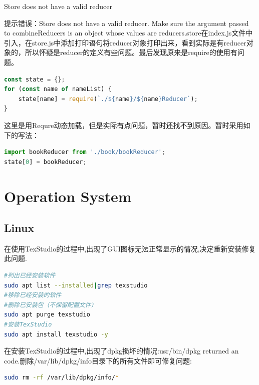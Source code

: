 \documentclass[12pt]{book}
\makeatletter
\numberwithin{dummy}{section}
\theoremstyle{ocrenumbox}
\theoremstyle{blacknumex}
\theoremstyle{blacknumbox}
\theoremstyle{ocrenum}
\renewcommand\paragraph{\@startsection{paragraph}{4}{\z@}
	{-2ex \@plus-.2ex \@minus .2ex}
	{.1ex}
	{\normalfont\small\sffamily\bfseries}}
\makeatother
\begin{document}
\paragraph{Store does not have a valid reducer}

提示错误：Store does not have a valid reducer. Make sure the argument passed to combineReducers is an object whose values are reducers.store在index.js文件中引入，在store.js中添加打印语句将reducer对象打印出来，看到实际是有reducer对象的，所以怀疑是reducer的定义有些问题。最后发现原来是require的使用有问题。

\begin{lstlisting}[language=Javascript]
const state = {};
for (const name of nameList) {
	state[name] = require(`./${name}/${name}Reducer`);
}
\end{lstlisting}

这里是用Requre动态加载，但是实际有点问题，暂时还找不到原因。暂时采用如下的写法：


\begin{lstlisting}[language=Javascript]
import bookReducer from './book/bookReducer';
state[0] = bookReducer;
\end{lstlisting}

\clearpage

\part{Operation System}

\chapter{Linux}

在使用TexStudio的过程中,出现了GUI图标无法正常显示的情况,决定重新安装修复此问题.

\begin{lstlisting}[language=Bash]
#列出已经安装软件
sudo apt list --installed|grep texstudio
#移除已经安装的软件
#删除已安装包（不保留配置文件)
sudo apt purge texstudio
#安装TexStudio
sudo apt install texstudio -y 
\end{lstlisting}

在安装TexStudio的过程中,出现了dpkg损坏的情况:usr/bin/dpkg returned an code.删除/var/lib/dpkg/info目录下的所有文件即可修复问题:

\begin{lstlisting}[language=Bash]
sudo rm -rf /var/lib/dpkg/info/*
\end{lstlisting}
\end{document}
